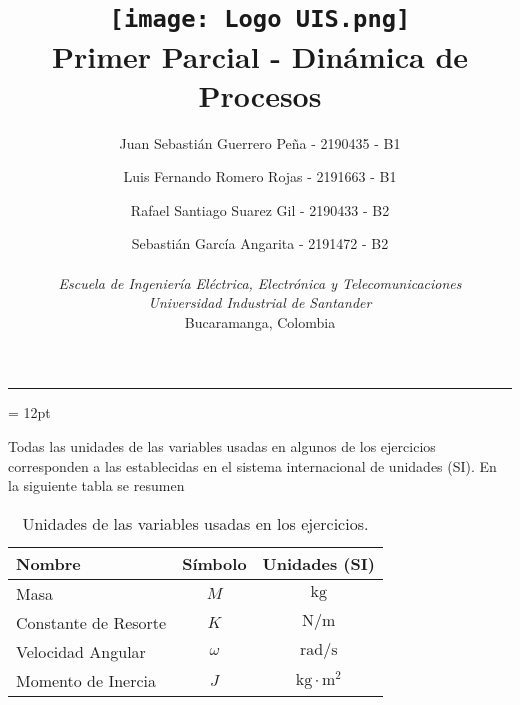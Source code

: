 \documentclass[letterpaper, 12pt]{article}
\title{\protect\vspace{-0.5cm}\protect\texttt{[image: Logo UIS.png]} \\
Primer Parcial - Dinámica de Procesos}
\author{Juan Sebastián Guerrero Peña - 2190435 - B1\and
        Luis Fernando Romero Rojas - 2191663 - B1\and
        Rafael Santiago Suarez Gil - 2190433 - B2\and
        Sebastián García Angarita - 2191472 - B2\\ \\
        \textit{Escuela de Ingeniería Eléctrica, Electrónica y Telecomunicaciones} \\
        \textit{Universidad Industrial de Santander}\\
        Bucaramanga, Colombia \\}
\date{}
\begin{document}
\maketitle
\begin{center}\rule{0.9\linewidth}{0.5pt}\end{center}
\parskip = 12pt

Todas las unidades de las variables usadas en algunos de los ejercicios corresponden a las establecidas en el sistema internacional de unidades (SI). En la siguiente tabla se resumen

\begin{table}[H]
\centering
\begin{tabular}{l|c|c}
    \hline
    Nombre \hspace{3cm} & Símbolo & Unidades (SI) \\
    \hline
    Masa & $M$ & $\mathrm{kg}$ \\
    Constante de Resorte & $K$ & $\mathrm{N/m}$ \\
    Velocidad Angular & $\omega$ & $\mathrm{rad/s}$ \\
    Momento de Inercia & $J$ & $\mathrm{kg\cdot m^2}$ \\
    
\end{tabular}
\caption{Unidades de las variables usadas en los ejercicios.}
\label{tab:my_label}
\end{table}
\end{document}
